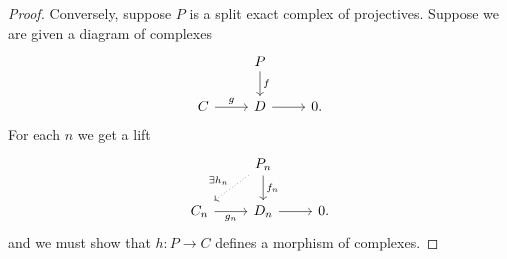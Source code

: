 \documentclass[10pt]{amsart}
\begin{document}
\begin{ex}
\begin{proof}
    Conversely, suppose $P$ is a split exact complex of projectives.
    Suppose we are given a diagram of complexes
    $$\begin{tikzcd}
      & P\arrow{d}{f} &\\
      C\arrow{r}{g} & D\arrow{r} & 0.
    \end{tikzcd}$$
    For each $n$ we get a lift
    $$\begin{tikzcd}
      & P_n\arrow{d}{f_n}\arrow[dotted,swap]{ld}{\exists h_n} &\\
      C_n\arrow[swap]{r}{g_n} & D_n\arrow{r} & 0.
    \end{tikzcd}$$
    and we must show that $h: P \rightarrow C$ defines a morphism of complexes.
    
  \end{proof}
\end{ex}
\end{document}
